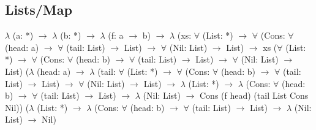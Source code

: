 \subsection*{Lists/Map}
{\selectfont
\vspace{0.5cm}
$\lambda$ (a: *) $\rightarrow$ $\lambda$ (b: *) $\rightarrow$ $\lambda$ (f: a $\rightarrow$ b) $\rightarrow$ $\lambda$ (xs: $\forall$ (List: *)
$\rightarrow$ $\forall$ (Cons: $\forall$ (head: a) $\rightarrow$ $\forall$ (tail: List) $\rightarrow$ List) $\rightarrow$ $\forall$ (Nil: List) $\rightarrow$ List)
$\rightarrow$ xs ($\forall$ (List: *) $\rightarrow$ $\forall$ (Cons: $\forall$ (head: b) $\rightarrow$ $\forall$ (tail: List) $\rightarrow$ List)
$\rightarrow$ $\forall$ (Nil: List) $\rightarrow$ List) ($\lambda$ (head: a) $\rightarrow$ $\lambda$ (tail: $\forall$ (List: *) $\rightarrow$
$\forall$ (Cons: $\forall$ (head: b) $\rightarrow$ $\forall$ (tail: List) $\rightarrow$ List) $\rightarrow$ $\forall$ (Nil: List)
$\rightarrow$ List) $\rightarrow$ $\lambda$ (List: *) $\rightarrow$ $\lambda$ (Cons: $\forall$ (head: b) $\rightarrow$ $\forall$
(tail: List) $\rightarrow$ List) $\rightarrow$ $\lambda$ (Nil: List) $\rightarrow$ Cons (f head) (tail List Cons Nil))
($\lambda$ (List: *) $\rightarrow$ $\lambda$ (Cons: $\forall$ (head: b) $\rightarrow$ $\forall$ (tail: List) $\rightarrow$
List) $\rightarrow$ $\lambda$ (Nil: List) $\rightarrow$ Nil)
}
